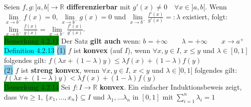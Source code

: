 \documentclass[landscape, 10pt]{article}
\newcommand{\R}{\mathbb{R}}
\begin{document}
\begin{multicols}{3}
                     Seien \textcolor{NavyBlue}{$f,g:]a,b[\longrightarrow\R$} 
                     \textbf{differenzierbar} mit 
                     \textcolor{NavyBlue}{$g'(x)\neq0\quad\forall x\in]a,b[$}. 
                     Wenn \textcolor{NavyBlue}{
                     $\lim\limits_{x\to b^{-}}f(x)=0,\,\lim\limits_{x\to b^{-}}g(x)=0$}
                     und \textcolor{NavyBlue}{
                     $\lim\limits_{x\to b^{-}}\frac{f'(x)}{g'(x)}=:\lambda$}
                     existiert, folgt: \textcolor{NavyBlue}{
                     $\lim\limits_{x\to b^{-}}\frac{f(x)}{g(x)}
                     =\lim\limits_{x\to b^{-}}\frac{f'(x)}{g'(x)}$}.\\
              \colorbox{green}{Bemerkung 4.2.11} 
                     Der Satz \textbf{gilt auch} wenn: 
                     \textcolor{NavyBlue}{
                     $b=+\infty\qquad\lambda=+\infty\qquad x\to a^{+}$}\\
              \colorbox{cyan}{Definition 4.2.13} 
                     \colorbox{SkyBlue}{(1)} 
                            \textcolor{NavyBlue}{$f$}
                            ist \textbf{konvex} (auf \textcolor{NavyBlue}{$I$}), wenn 
                            \textcolor{NavyBlue}{$\forall x,y\in I,\,x\leqslant y$ 
                            und $\lambda\in[0,1]$}
                            folgendes gilt: \textcolor{NavyBlue}{
                            $f(\lambda x+(1-\lambda)y)
                            \leqslant\lambda f(x)+(1-\lambda)f(y)$}\\
                     \colorbox{SkyBlue}{(2)} 
                            \textcolor{NavyBlue}{$f$} ist 
                            \textbf{streng konvex}, 
                            wenn \textcolor{NavyBlue}{$\forall x,y\in I,\,x<y$}
                            und \textcolor{NavyBlue}{$\lambda\in]0,1[$} 
                            folgendes gilt: 
                            \textcolor{NavyBlue}{
                            $f(\lambda x+(1-\lambda)y)
                            <\lambda f(x)+(1-\lambda)f(y)$}\\ 
              \colorbox{green}{Bemerkung 4.2.14} 
                     Sei \textcolor{NavyBlue}{$f:I\longrightarrow\R$} 
                     \textbf{konvex}. Ein einfacher Induktionsbeweis zeigt, dass 
                     \textcolor{NavyBlue}{
                     $\forall n\geqslant1,\,\{x_1,...,x_n\}\subseteq I$} 
                     und \textcolor{NavyBlue}{$\lambda_1,...\lambda_n$} in 
                     \textcolor{NavyBlue}{$[0,1]$} mit 
                     \textcolor{NavyBlue}{$\sum_{i=1}^n\lambda_i=1$}

\end{multicols}
\end{document}
